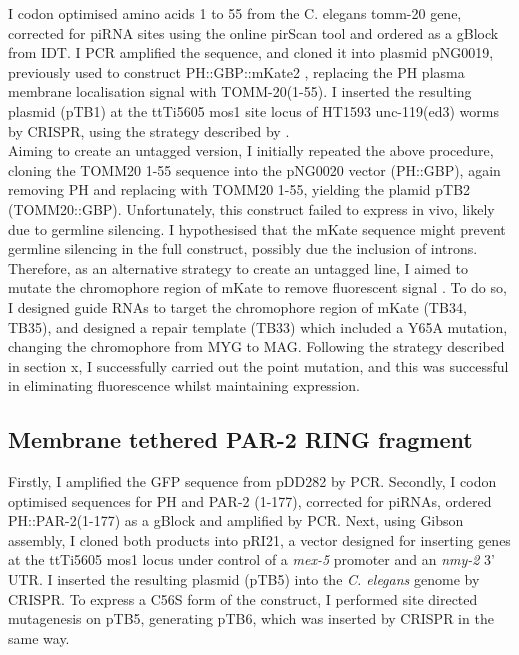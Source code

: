 \documentclass[12pt]{"report"}
\begin{document}
I codon optimised amino acids 1 to 55 from the C. elegans tomm-20 gene, corrected for piRNA sites using the online pirScan tool \citep{Wu2018b} and ordered as a gBlock from IDT. I PCR amplified the sequence, and cloned it into plasmid pNG0019, previously used to construct PH::GBP::mKate2 \citep{Rodriguez2017}, replacing the PH plasma membrane localisation signal with TOMM-20(1-55). I inserted the resulting plasmid (pTB1) at the ttTi5605 mos1 site locus of HT1593 unc-119(ed3) worms by CRISPR, using the strategy described by \textcite{Dickinson2013}. \\

Aiming to create an untagged version, I initially repeated the above procedure, cloning the TOMM20 1-55 sequence into the pNG0020 vector (PH::GBP), again removing PH and replacing with TOMM20 1-55, yielding the plamid pTB2 (TOMM20::GBP). Unfortunately, this construct failed to express in vivo, likely due to germline silencing. I hypothesised that the mKate sequence might prevent germline silencing in the full construct, possibly due the inclusion of introns. Therefore, as an alternative strategy to create an untagged line, I aimed to mutate the chromophore region of mKate to remove fluorescent signal \citep{Pletnev2008}. To do so, I designed guide RNAs to target the chromophore region of mKate (TB34, TB35), and designed a repair template (TB33) which included a Y65A mutation, changing the chromophore from MYG to MAG. Following the strategy described in section x, I successfully carried out the point mutation, and this was successful in eliminating fluorescence whilst maintaining expression.\\


\subsection{Membrane tethered PAR-2 RING fragment}

Firstly, I amplified the GFP sequence from pDD282 by PCR. Secondly, I codon optimised sequences for PH and PAR-2 (1-177), corrected for piRNAs, ordered PH::PAR-2(1-177) as a gBlock and amplified by PCR. Next, using Gibson assembly, I cloned both products into pRI21, a vector designed for inserting genes at the ttTi5605 mos1 locus under control of a \textit{mex-5} promoter and an \textit{nmy-2} 3' UTR. I inserted the resulting plasmid (pTB5) into the \textit{C. elegans} genome by CRISPR. To express a C56S form of the construct, I performed site directed mutagenesis on pTB5, generating pTB6, which was inserted by CRISPR in the same way.\\
\end{document}

